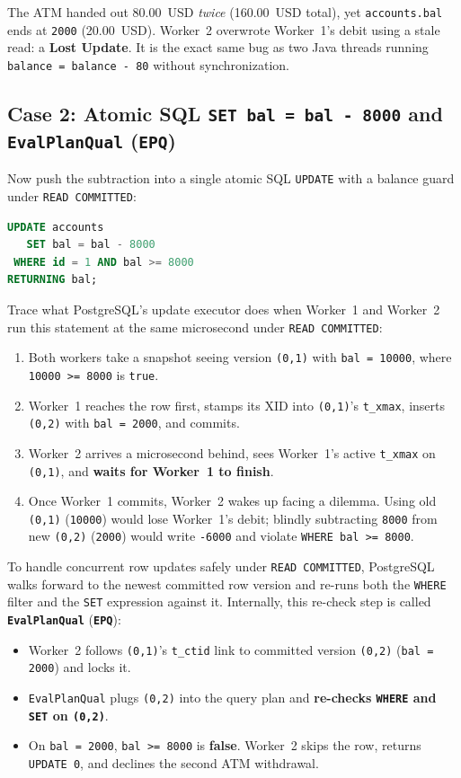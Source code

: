The ATM handed out 80.00~USD \emph{twice} (160.00~USD total), yet \texttt{accounts.bal} ends at \texttt{2000} (20.00~USD). Worker~2 overwrote Worker~1's debit using a stale read: a \textbf{Lost Update}. It is the exact same bug as two Java threads running \texttt{balance = balance - 80} without synchronization.

\subsection{Case 2: Atomic SQL \texttt{SET bal = bal - 8000} and \texttt{EvalPlanQual} (\texttt{EPQ})}

Now push the subtraction into a single atomic SQL \texttt{UPDATE} with a balance guard under \texttt{READ COMMITTED}:

\begin{lstlisting}[language=SQL]
UPDATE accounts
   SET bal = bal - 8000
 WHERE id = 1 AND bal >= 8000
RETURNING bal;
\end{lstlisting}

Trace what PostgreSQL's update executor does when Worker~1 and Worker~2 run this statement at the same microsecond under \texttt{READ COMMITTED}:
\begin{enumerate}
  \item Both workers take a snapshot seeing version \texttt{(0,1)} with \texttt{bal = 10000}, where \texttt{10000 >= 8000} is \texttt{true}.
  \item Worker~1 reaches the row first, stamps its XID into \texttt{(0,1)}'s \texttt{t\_xmax}, inserts \texttt{(0,2)} with \texttt{bal = 2000}, and commits.
  \item Worker~2 arrives a microsecond behind, sees Worker~1's active \texttt{t\_xmax} on \texttt{(0,1)}, and \textbf{waits for Worker~1 to finish}.
  \item Once Worker~1 commits, Worker~2 wakes up facing a dilemma. Using old \texttt{(0,1)} (\texttt{10000}) would lose Worker~1's debit; blindly subtracting \texttt{8000} from new \texttt{(0,2)} (\texttt{2000}) would write \texttt{-6000} and violate \texttt{WHERE bal >= 8000}.
\end{enumerate}

To handle concurrent row updates safely under \texttt{READ COMMITTED}, PostgreSQL walks forward to the newest committed row version and re-runs both the \texttt{WHERE} filter and the \texttt{SET} expression against it. Internally, this re-check step is called \textbf{\texttt{EvalPlanQual}} (\textbf{\texttt{EPQ}}):
\begin{itemize}
  \item Worker~2 follows \texttt{(0,1)}'s \texttt{t\_ctid} link to committed version \texttt{(0,2)} (\texttt{bal = 2000}) and locks it.
  \item \texttt{EvalPlanQual} plugs \texttt{(0,2)} into the query plan and \textbf{re-checks \texttt{WHERE} and \texttt{SET} on \texttt{(0,2)}}.
  \item On \texttt{bal = 2000}, \texttt{bal >= 8000} is \textbf{false}. Worker~2 skips the row, returns \texttt{UPDATE 0}, and declines the second ATM withdrawal.
\end{itemize}

